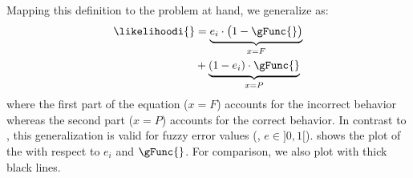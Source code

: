 Mapping this definition to the problem at hand, we generalize
 as:
\begin{equation}
  \label{eq:fuzzinel:likelihood-generalization}
  \begin{split} \likelihoodi{} &= \underbrace{e_i \cdot \big(1 -
      \gFunc{}\big)}_{x = F} \\
    &+ \underbrace{\vphantom{\big(}(1-e_i) \cdot \gFunc{}}_{x = P}
  \end{split}
\end{equation}
\noindent
where the first part of the equation ($x=F$) accounts for the
incorrect behavior whereas the second part ($x=P$) accounts for the
correct behavior.
%
In contrast to , this generalization is valid for
fuzzy error values (\ie, $e \in ]0,1[$).
%
 shows the plot of the
 with respect to $e_i$ and
$\gFunc{}$.
%
For comparison, we also plot  with thick
black lines.

